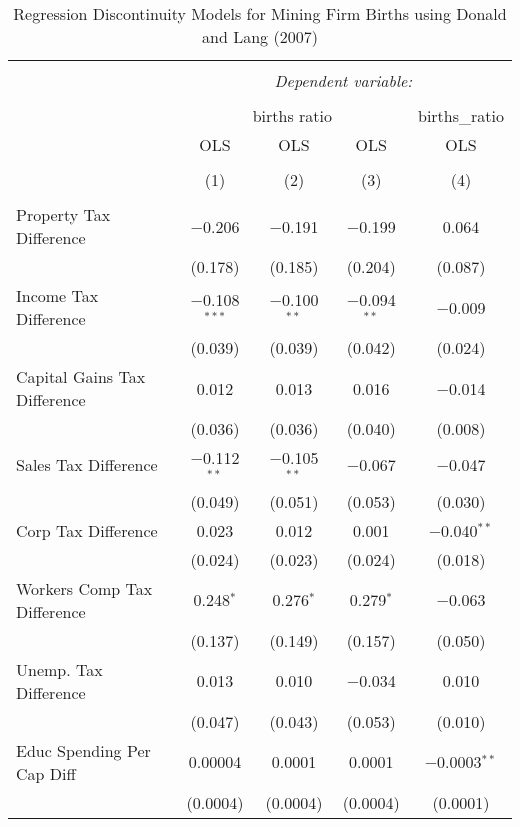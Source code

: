 
\begin{table}[!htbp] \centering 
  \caption{Regression Discontinuity Models for  Mining Firm Births using Donald and Lang (2007)} 
  \label{} 
\begin{tabular}{@{\extracolsep{5pt}}lcccc} 
\\[-1.8ex]\hline 
\hline \\[-1.8ex] 
 & \multicolumn{4}{c}{\textit{Dependent variable:}} \\ 
\cline{2-5} 
\\[-1.8ex] & \multicolumn{3}{c}{births ratio} & births\_ratio \\ 
 & OLS & OLS & OLS & OLS \\ 
\\[-1.8ex] & (1) & (2) & (3) & (4)\\ 
\hline \\[-1.8ex] 
 Property Tax Difference & $-$0.206 & $-$0.191 & $-$0.199 & 0.064 \\ 
  & (0.178) & (0.185) & (0.204) & (0.087) \\ 
  Income Tax Difference & $-$0.108$^{***}$ & $-$0.100$^{**}$ & $-$0.094$^{**}$ & $-$0.009 \\ 
  & (0.039) & (0.039) & (0.042) & (0.024) \\ 
  Capital Gains Tax Difference & 0.012 & 0.013 & 0.016 & $-$0.014 \\ 
  & (0.036) & (0.036) & (0.040) & (0.008) \\ 
  Sales Tax Difference & $-$0.112$^{**}$ & $-$0.105$^{**}$ & $-$0.067 & $-$0.047 \\ 
  & (0.049) & (0.051) & (0.053) & (0.030) \\ 
  Corp Tax Difference & 0.023 & 0.012 & 0.001 & $-$0.040$^{**}$ \\ 
  & (0.024) & (0.023) & (0.024) & (0.018) \\ 
  Workers Comp Tax Difference & 0.248$^{*}$ & 0.276$^{*}$ & 0.279$^{*}$ & $-$0.063 \\ 
  & (0.137) & (0.149) & (0.157) & (0.050) \\ 
  Unemp. Tax Difference & 0.013 & 0.010 & $-$0.034 & 0.010 \\ 
  & (0.047) & (0.043) & (0.053) & (0.010) \\ 
  Educ Spending Per Cap Diff & 0.00004 & 0.0001 & 0.0001 & $-$0.0003$^{**}$ \\ 
  & (0.0004) & (0.0004) & (0.0004) & (0.0001) \\ 

\end{tabular}
\end{table}
